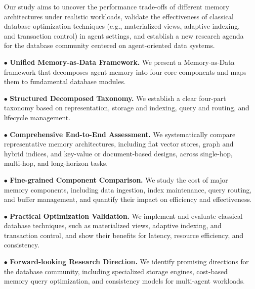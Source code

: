 Our study aims to uncover the performance trade-offs of different memory architectures under realistic workloads, validate the effectiveness of classical database optimization techniques (e.g., materialized views, adaptive indexing, and transaction control) in agent settings, and establish a new research agenda for the database community centered on agent-oriented data systems.

\noindent $\bullet$ \textbf{Unified Memory-as-Data Framework.}
We present a Memory-as-Data framework that decomposes agent memory into four core components and maps them to fundamental database modules. 

\noindent $\bullet$ \textbf{Structured Decomposed Taxonomy.}
We establish a clear four-part taxonomy based on representation, storage and indexing, query and routing, and lifecycle management.

\noindent $\bullet$ \textbf{Comprehensive End-to-End Assessment.}
We systematically compare representative memory architectures, including flat vector stores, graph and hybrid indices, and key-value or document-based designs, across single-hop, multi-hop, and long-horizon tasks.

\noindent $\bullet$ \textbf{Fine-grained Component Comparison.}
We study the cost of major memory components, including data ingestion, index maintenance, query routing, and buffer management, and quantify their impact on efficiency and effectiveness.

\noindent $\bullet$ \textbf{Practical Optimization Validation.} 
We implement and evaluate classical database techniques, such as materialized views, adaptive indexing, and transaction control, and show their benefits for latency, resource efficiency, and consistency.

\noindent $\bullet$ \textbf{Forward-looking Research Direction.}
We identify promising directions for the database community, including specialized storage engines, cost-based memory query optimization, and consistency models for multi-agent workloads.




